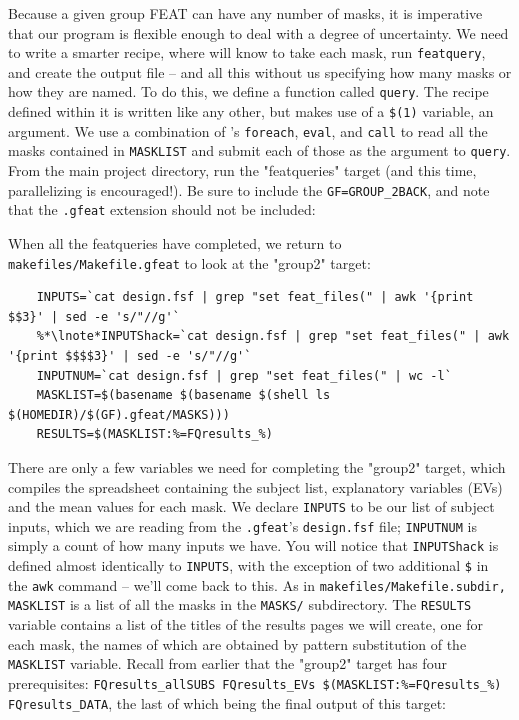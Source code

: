 Because a given group FEAT can have any number of masks, it is imperative that our program is flexible enough to deal with a degree of uncertainty. We need to write a smarter recipe, where \maken{} will know to take each mask, run \texttt{featquery}, and create the output file -- and all this without us specifying how many masks or how they are named.  To do this, we define a function called \texttt{query}. The recipe defined within it is written like any other, but makes use of a \texttt{\$(1)} variable, an argument. We use a combination of \maken{}'s \texttt{foreach}, \texttt{eval}, and \texttt{call} to read all the masks contained in \texttt{MASKLIST} and submit each of those as the argument to \texttt{query}. From the main project directory, run the "featqueries" target (and this time, parallelizing is encouraged!). Be sure to include the \texttt{GF=GROUP_2BACK}, and note that the \texttt{.gfeat} extension should not be included:

When all the featqueries have completed, we return to \texttt{makefiles/Makefile.gfeat} to look at the "group2" target:

\begin{lstlisting}
	INPUTS=`cat design.fsf | grep "set feat_files(" | awk '{print $$3}' | sed -e 's/"//g'`
	%*\lnote*INPUTShack=`cat design.fsf | grep "set feat_files(" | awk '{print $$$$3}' | sed -e 's/"//g'`
	INPUTNUM=`cat design.fsf | grep "set feat_files(" | wc -l`
	MASKLIST=$(basename $(basename $(shell ls $(HOMEDIR)/$(GF).gfeat/MASKS)))
	RESULTS=$(MASKLIST:%=FQresults_%)
\end{lstlisting}

There are only a few variables we need for completing the "group2" target, which compiles the spreadsheet containing the subject list, explanatory variables (EVs) and the mean values for each mask. We declare \texttt{INPUTS} to be our list of subject inputs, which we are reading from the \texttt{.gfeat}'s \texttt{design.fsf} file; \texttt{INPUTNUM} is simply a count of how many inputs we have. You will notice that \texttt{INPUTShack} is defined almost identically to \texttt{INPUTS}, with the exception of two additional \texttt{\$} in the \texttt{awk} command -- we'll come back to this. As in \texttt{makefiles/Makefile.subdir, MASKLIST} is a list of all the masks in the \texttt{MASKS/} subdirectory. The \texttt{RESULTS} variable contains a list of the titles of the results pages we will create, one for each mask, the names of which are obtained by pattern substitution of the \texttt{MASKLIST} variable. Recall from earlier that the "group2" target has four prerequisites: \texttt{FQresults_allSUBS FQresults_EVs \$(MASKLIST:\%=FQresults_\%) FQresults_DATA}, the last of which being the final output of this target:


